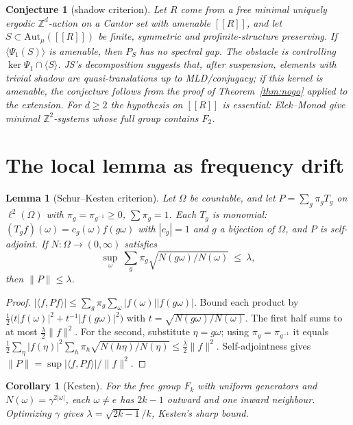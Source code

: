 \documentclass[11pt]{article}
\newtheorem{lemma}[theorem]{Lemma}
\newtheorem{corollary}[theorem]{Corollary}
\newtheorem{conjecture}[theorem]{Conjecture}
\theoremstyle{definition}
\theoremstyle{remark}
\newcommand{\Z}{\mathbb Z}
\newcommand{\ff}[1]{[\![#1]\!]}
\begin{document}
\begin{conjecture}[shadow criterion]
Let $R$ come from a free minimal uniquely ergodic $\Z^d$-action on a Cantor set with amenable $\ff R$, and let $S\subset\mathrm{Aut}_\mu(\ff R)$ be finite, symmetric and profinite-structure preserving. If $\langle\Psi_1(S)\rangle$ is amenable, then $P_S$ has no spectral gap.
The obstacle is controlling $\ker\Psi_1\cap\langle S\rangle$. JS's decomposition suggests that, after suspension, elements with trivial shadow are quasi-translations up to MLD/conjugacy; if this kernel is amenable, the conjecture follows from the proof of Theorem~\ref{thm:nogo} applied to the extension. For $d\ge2$ the hypothesis on $\ff R$ is essential: Elek--Monod give minimal $\Z^2$-systems whose full group contains $F_2$.
\end{conjecture}

\section{The local lemma as frequency drift}

\begin{lemma}[Schur--Kesten criterion]\label{lem:sk}
Let $\Omega$ be countable, and let $P=\sum_g\pi_gT_g$ on $\ell^2(\Omega)$ with $\pi_g=\pi_{g^{-1}}\ge0$, $\sum\pi_g=1$. Each $T_g$ is \emph{monomial}: $(T_gf)(\omega)=c_g(\omega)f(g\omega)$ with $|c_g|=1$ and $g$ a bijection of $\Omega$, and $P$ is self-adjoint. If $N:\Omega\to(0,\infty)$ satisfies
\[\sup_{\omega}\ \sum_g\pi_g\sqrt{N(g\omega)/N(\omega)}\ \le\ \lambda,\]
then $\|P\|\le\lambda$.
\end{lemma}

\begin{proof}
$|\langle f,Pf\rangle|\le\sum_g\pi_g\sum_\omega|f(\omega)||f(g\omega)|$. Bound each product by $\frac12\big(t|f(\omega)|^2+t^{-1}|f(g\omega)|^2\big)$ with $t=\sqrt{N(g\omega)/N(\omega)}$. The first half sums to at most $\frac\lambda2\|f\|^2$. For the second, substitute $\eta=g\omega$; using $\pi_g=\pi_{g^{-1}}$ it equals $\frac12\sum_\eta|f(\eta)|^2\sum_h\pi_h\sqrt{N(h\eta)/N(\eta)}\le\frac\lambda2\|f\|^2$. Self-adjointness gives $\|P\|=\sup|\langle f,Pf\rangle|/\|f\|^2$.
\end{proof}

\begin{corollary}[Kesten]
For the free group $F_k$ with uniform generators and $N(\omega)=\gamma^{2|\omega|}$, each $\omega\ne e$ has $2k-1$ outward and one inward neighbour. Optimizing $\gamma$ gives $\lambda=\sqrt{2k-1}/k$, Kesten's sharp bound.
\end{corollary}
\end{document}
